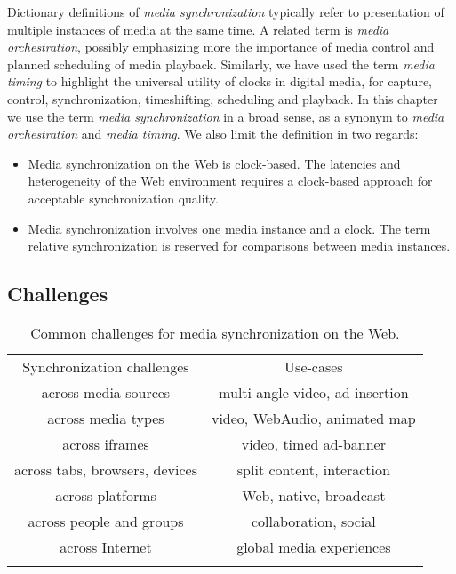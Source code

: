 Dictionary definitions of \emph{media synchronization} typically refer to
presentation of multiple instances of media at the same time. A related term
is \emph{media orchestration}, possibly emphasizing more the importance of
media control and planned scheduling of media playback. Similarly, we have
used the term \emph{media timing} to highlight the universal utility of clocks
in digital media, for capture, control, synchronization, timeshifting,
scheduling and playback. In this chapter we use the term \emph{media
synchronization} in a broad sense, as a synonym to \emph{media orchestration}
and \emph{media timing}. We also limit the definition in two regards:

\begin{itemize}
\item{Media synchronization on the Web is clock-based. The latencies and heterogeneity of the Web environment requires a clock-based approach for acceptable synchronization quality.}
\item{Media synchronization involves one media instance and a clock. The term relative synchronization is reserved for comparisons between media instances.}
\end{itemize}

\subsection{Challenges}


\begin{table}
\caption{Common challenges for media synchronization on the Web.}
\label{tab:challenges}
\setlength{\tabcolsep}{10pt}
\begin{tabular}{cc}
\hline\noalign{\smallskip}
Synchronization challenges & Use-cases \\
\noalign{\smallskip}\svhline\noalign{\smallskip}
across media sources & multi-angle video, ad-insertion \\
across media types & video, WebAudio, animated map \\
across iframes & video, timed ad-banner \\
across tabs, browsers, devices & split content, interaction \\
across platforms & Web, native, broadcast \\
across people and groups & collaboration, social \\
across Internet & global media experiences \\
\noalign{\smallskip}\hline\noalign{\smallskip}
\end{tabular}
\end{table} 



